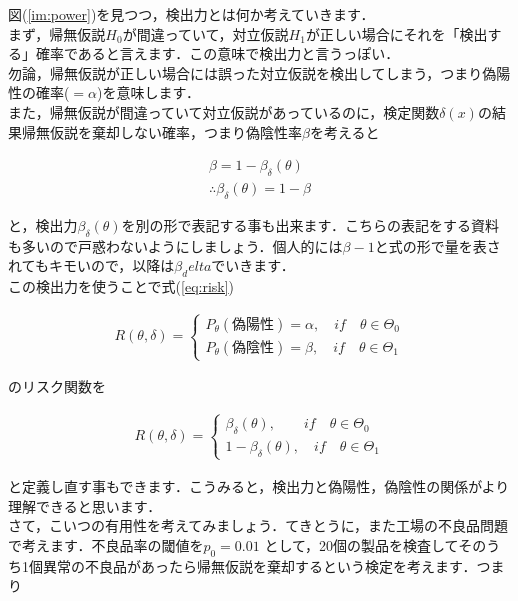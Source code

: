 \documentclass[11pt,a4paper]{ujreport} 	%
\begin{document}
図(\ref{im:power})を見つつ，検出力とは何か考えていきます．\\

まず，帰無仮説$H_0$が間違っていて，対立仮説$H_1$が正しい場合にそれを「検出する」確率であると言えます．この意味で検出力と言うっぽい．\\

勿論，帰無仮説が正しい場合には誤った対立仮説を検出してしまう，つまり偽陽性の確率($=\alpha$)を意味します．\\

また，帰無仮説が間違っていて対立仮説があっているのに，検定関数$\delta(x)$の結果帰無仮説を棄却しない確率，つまり偽陰性率$\beta$を考えると

\begin{align}
  \beta = 1- \beta_\delta(\theta)\\
  \therefore \beta_\delta(\theta) = 1- \beta
\end{align}

と，検出力$\beta_\delta(\theta)$を別の形で表記する事も出来ます．こちらの表記をする資料も多いので戸惑わないようにしましょう．個人的には$\beta-1$と式の形で量を表されてもキモいので，以降は$\beta_delta$でいきます．\\

この検出力を使うことで式(\ref{eq:risk})

\begin{align}
  R(\theta, \delta) = 
  \left\{
    \begin{array}{l}
    P_\theta(偽陽性)=\alpha, \quad if \quad \theta \in \Theta_0\\
    P_\theta(偽陰性)=\beta, \quad if \quad \theta \in \Theta_1
    \end{array}
  \right.
\end{align}

のリスク関数を

\begin{align}
  R(\theta, \delta) = 
  \left\{
    \begin{array}{l}
    \beta_\delta(\theta), \qquad if \quad \theta \in \Theta_0\\
    1-\beta_\delta(\theta), \quad if \quad \theta \in \Theta_1
    \end{array}
  \right.
  \label{eq:risk2}
\end{align}


と定義し直す事もできます．こうみると，検出力と偽陽性，偽陰性の関係がより理解できると思います．\\


さて，こいつの有用性を考えてみましょう．てきとうに，また工場の不良品問題で考えます．不良品率の閾値を$p_0=0.01$
として，20個の製品を検査してそのうち1個異常の不良品があったら帰無仮説を棄却するという検定を考えます．つまり
\end{document}
